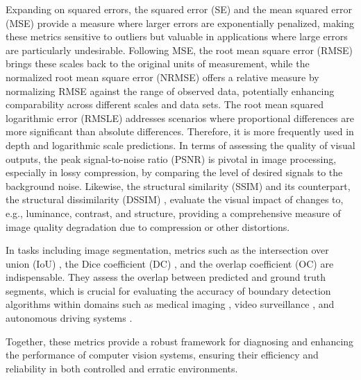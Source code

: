 \documentclass{article}
\begin{document}
Expanding on squared errors, the squared error (SE) \cite{draper1998applied} and the mean squared error (MSE) \cite{bickel2015mathematical} provide a measure where larger errors are exponentially penalized, making these metrics sensitive to outliers but valuable in applications where large errors are particularly undesirable. Following MSE, the root mean square error (RMSE) \cite{willmott2005advantages, hyndman2006another, pontius2008components} brings these scales back to the original units of measurement, while the normalized root mean square error (NRMSE) \cite{chang2004air, kim2005missing} offers a relative measure by normalizing RMSE against the range of observed data, potentially enhancing comparability across different scales and data sets. The root mean squared logarithmic error (RMSLE) \cite{nafees2021predictive} addresses scenarios where proportional differences are more significant than absolute differences. Therefore, it is more frequently used in depth and logarithmic scale predictions. In terms of assessing the quality of visual outputs, the peak signal-to-noise ratio (PSNR) \cite{salomon2004data, huynh2008scope} is pivotal in image processing, especially in lossy compression, by comparing the level of desired signals to the background noise. Likewise, the structural similarity (SSIM) \cite{wang2004image, ghodrati2019mr} and its counterpart, the structural dissimilarity (DSSIM) \cite{wang2004image, ghodrati2019mr}, evaluate the visual impact of changes to, e.g., luminance, contrast, and structure, providing a comprehensive measure of image quality degradation due to compression or other distortions.

In tasks including image segmentation, metrics such as the intersection over union (IoU) \cite{jaccard1912distribution, murphy1996finley, rezatofighi2019generalized, zou2023object}, the Dice coefficient (DC) \cite{dice1945measures, sorenson1948method}, and the overlap coefficient (OC) \cite{szymkiewicz1934conlribution, sempson1947holarctic, bell1962mutual, goodall1978sample} are indispensable. They assess the overlap between predicted and ground truth segments, which is crucial for evaluating the accuracy of boundary detection algorithms within domains such as medical imaging \cite{suzuki2017overview, esteva2021deep}, video surveillance \cite{buch2011review, brunetti2018computer}, and autonomous driving systems \cite{feng2021review, zablocki2022explainability}.

Together, these metrics provide a robust framework for diagnosing and enhancing the performance of computer vision systems, ensuring their efficiency and reliability in both controlled and erratic environments.
\end{document}

